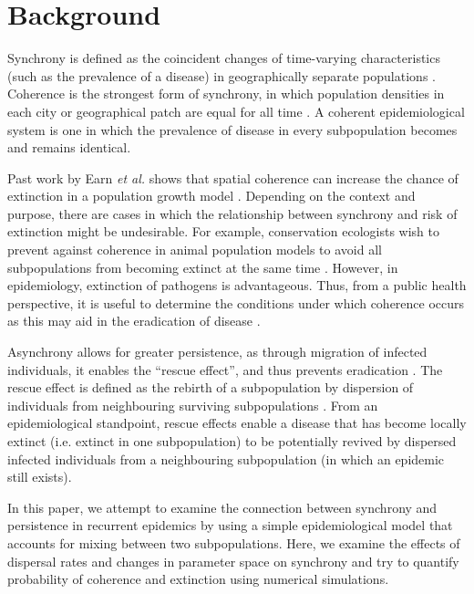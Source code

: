 \documentclass[12pt]{article}
\begin{document}
\tableofcontents

\section{Background}
 
Synchrony is defined as the coincident changes of time-varying characteristics (such as the prevalence of a disease) in geographically separate populations \cite{liebhold2004spatial}. Coherence is the strongest form of synchrony, in which population densities in each city or geographical patch are equal for all time \cite{earn2006global}. A coherent epidemiological system is one in which the prevalence of disease in every subpopulation becomes and remains identical.

Past work by Earn \textit{et al.} shows that spatial coherence can increase the chance of extinction in a population growth model \cite{Earn2000conservation}. 
Depending on the context and purpose, there are cases in which the relationship between synchrony and risk of extinction might be undesirable.
For example, conservation ecologists wish to prevent against coherence in animal population models to avoid all subpopulations from becoming extinct at the same time \cite{Earn2000conservation}. However, in epidemiology, extinction of pathogens is advantageous. Thus, from a public health perspective, it is useful to determine the conditions under which coherence occurs as this may aid in the eradication of disease \cite{earn1998persistence}. 

Asynchrony allows for greater persistence, as through migration of infected individuals, it enables the ``rescue effect'', and thus prevents eradication \cite{brown1977turnover}. 
The rescue effect is defined as the rebirth of a subpopulation by dispersion of individuals from neighbouring surviving subpopulations \cite{nicholson1935balance,levins1969some,adler1993migration}. 
From an epidemiological standpoint, rescue effects enable a disease that has become locally extinct (i.e. extinct in one subpopulation) to be potentially revived by dispersed infected individuals from a neighbouring subpopulation (in which an epidemic still exists).

In this paper, we attempt to examine the connection between synchrony and persistence in recurrent epidemics by using a simple epidemiological model that accounts for mixing between two subpopulations.
Here, we examine the effects of dispersal rates and changes in parameter space on synchrony and try to quantify probability of coherence and extinction using numerical simulations.
\end{document}
